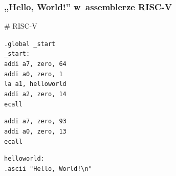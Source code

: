 \documentclass[10pt,t]{beamer}
\begin{document}
\begin{frame}
  \frametitle{„Hello, World!” w~assemblerze RISC-V
    \parencite{Anonymous-Hello-World-in-x86-Assembly-Language}}


  \# RISC-V

  \texttt{.global \_start} \\
  \texttt{\_start:} \\
  \hphantom{aaaa} \texttt{addi a7, zero, 64} \\
  \hphantom{aaaa} \texttt{addi a0, zero, 1} \\
  \hphantom{aaaa} \texttt{la a1, helloworld} \\
  \hphantom{aaaa} \texttt{addi a2, zero, 14} \\
  \hphantom{aaaa} \texttt{ecall}
  \vspace{0.8em}

  \hphantom{aaaa} \texttt{addi a7, zero, 93} \\
  \hphantom{aaaa} \texttt{addi a0, zero, 13} \\
  \hphantom{aaaa} \texttt{ecall}
  \vspace{0.8em}

  \texttt{helloworld:} \\
  \hphantom{aaaa} \texttt{.ascii "Hello, World!\textbackslash n"}

\end{frame}
\end{document}
